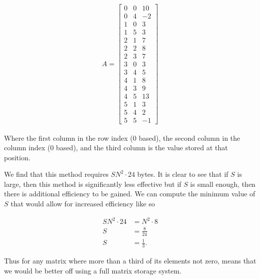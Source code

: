\documentclass[../fem.tex]{subfiles}
\begin{document}
\begin{align*}
  A = \begin{bmatrix}
    0 & 0 & 10 \\
    0 & 4 & -2 \\
    1 & 0 & 3 \\
    1 & 5 & 3 \\
    2 & 1 & 7 \\
    2 & 2 & 8 \\
    2 & 3 & 7 \\
    3 & 0 & 3 \\
    3 & 4 & 5 \\
    4 & 1 & 8 \\
    4 & 3 & 9 \\
    4 & 5 & 13 \\
    5 & 1 & 3 \\
    5 & 4 & 2 \\
    5 & 5 & -1
  \end{bmatrix}
\end{align*}

Where the first column in the row index ($0$ based), the second column in the
column index ($0$ based), and the third column is the value stored at that
position.

We find that this method requires $SN^2\cdot24$ bytes. It is clear to see that
if $S$ is large, then this method is significantly less effective but if $S$ is
small enough, then there is additional efficiency to be gained. We can compute
the minimum value of $S$ that would allow for increased efficiency like so

\begin{align*}
  SN^2\cdot24&=N^2\cdot8\\
  S&=\frac{8}{24}\\
  S&=\frac{1}{3}.
\end{align*}

Thus for any matrix where more than a third of its elements not zero, means
that we would be better off using a full matrix storage system.

\begin{Figure}
  \begin{center}
  \end{center}
  \label{fig:mat_dok}
\end{Figure}
\end{document}
